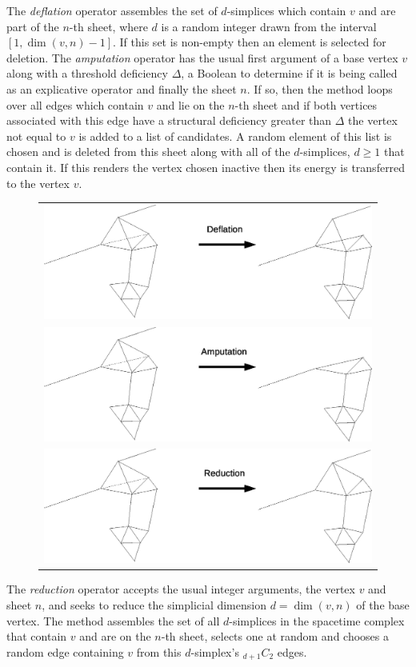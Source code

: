 \documentclass[12pt,letterpaper]{report}
\begin{document}
The \emph{deflation} operator assembles the set of $d$-simplices which contain $v$ and are part of the $n$-th 
sheet, where $d$ is a random integer drawn from the interval $[1,\dim(v,n)-1]$. If this set is non-empty then 
an element is selected for deletion. The \emph{amputation} operator has the usual first argument of a base 
vertex $v$ along with a threshold deficiency $\Delta$, a Boolean to determine if it is being called as an explicative 
operator and finally the sheet $n$. If so, then the method loops over all edges which contain $v$ and lie on the 
$n$-th sheet and if both vertices associated with this edge have a structural deficiency greater than $\Delta$ 
the vertex not equal to $v$ is added to a list of candidates. A random element of this list is chosen and is 
deleted from this sheet along with all of the $d$-simplices, $d\ge 1$ that contain it. If this renders the vertex 
chosen inactive then its energy is transferred to the vertex $v$.      
\begin{figure}[htp]
\centering
\label{explicative1}
\begin{tabular}{c}
\includegraphics[width=5in]{images/deflation.eps} \\
\includegraphics[width=5in]{images/amputation.eps} \\
\includegraphics[width=5in]{images/reduction.eps}
\end{tabular}
\end{figure}
The \emph{reduction} operator accepts the usual integer arguments, the vertex $v$ and sheet $n$, and seeks to 
reduce the simplicial dimension $d=\dim(v,n)$ of the base vertex. The method assembles the set of all 
$d$-simplices in the spacetime complex that contain $v$ and are on the $n$-th sheet, selects one at random and 
chooses a random edge containing $v$ from this $d$-simplex's $_{d+1}C_2$ edges. 
\end{document}

